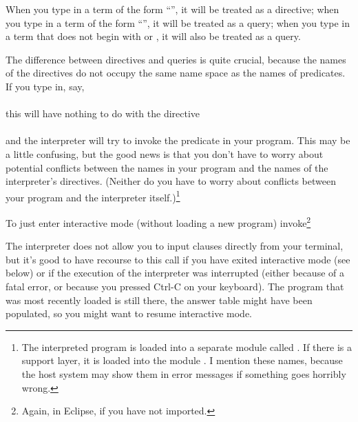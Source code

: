 When you type in a term of the form ``'', it will be
treated as a directive; when you type in a term of the form
``'', it will be treated as a query; when
you type in a term that does not begin with \prog{:-} or , it will
also be treated as a query.

The difference between directives and queries is quite crucial, because the
names of the directives do not occupy the same name space
as the names of predicates.  If you type in, say,\\
\ind{}\\
this will have nothing to do with the directive\\
\ind{}\\
and the interpreter will try to invoke the predicate  in your
program.  This may be a little confusing, but the good news is that you don't
have to worry about potential conflicts between the names in your program and
the names of the interpreter's directives.  (Neither do you have to worry
about conflicts between your program and the interpreter itself.)\footnote{
  The interpreted program is loaded into a separate module
  called .  If there is a support layer, it is loaded
  into the module .  I mention these names, because the host
  system may show them in error messages if something goes horribly wrong.
}

\vfill %


%

To just enter interactive mode (without loading a new program)
invoke\footnote{
  Again,  in Eclipse, if you have not imported.}\\
\ind{}

The interpreter does not allow you to input clauses directly from your
terminal, but it's good to have recourse to this call if you have exited
interactive mode (see below) or if the execution of the interpreter was
interrupted (either because of a fatal error, or because you pressed Ctrl-C
on your keyboard). The program that was most recently loaded is still there,
the answer table might have been populated, so you might want to resume
interactive mode.


%

